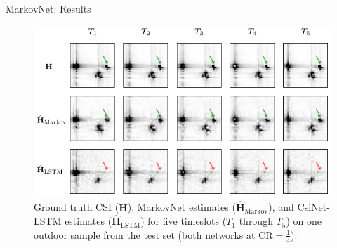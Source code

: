 \documentclass{beamer}
\begin{document}
  \begin{frame}{MarkovNet: Results}
    \begin{figure}[htb] \centering 
      \includegraphics[width=0.9\linewidth]{batch0_csi_compare_cr512_annot.pdf}
      \caption{Ground truth CSI ($\mathbf H$), MarkovNet estimates ($\hat{\mathbf H}_{\text{Markov}}$), and CsiNet-LSTM estimates ($\hat{\mathbf H}_{\text{LSTM}}$) for five timeslots ($T_1$ through $T_5$) on one outdoor sample from the test set (both networks at $\text{CR}=\frac 14$).} 
      \label{fig:csi_img_compare} 
    \end{figure}
  \end{frame}
\end{document}
